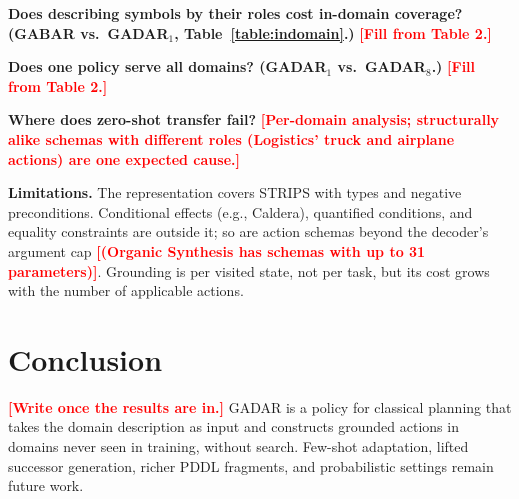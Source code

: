 \documentclass[letterpaper]{article} %
\newcommand{\gadar}{GADAR}                    %
\newcommand{\todonum}[1]{\textcolor{red}{\textbf{[#1]}}}
\begin{document}
\textbf{Does describing symbols by their roles cost in-domain coverage?
(GABAR vs.\ \gadar{}$_1$, Table~\ref{table:indomain}.)} \todonum{Fill from
Table 2.}

\textbf{Does one policy serve all domains? (\gadar{}$_1$ vs.\ \gadar{}$_8$.)}
\todonum{Fill from Table 2.}

\textbf{Where does zero-shot transfer fail?} \todonum{Per-domain analysis;
structurally alike schemas with different roles (Logistics' truck and
airplane actions) are one expected cause.}

\textbf{Limitations.} The representation covers STRIPS with types and
negative preconditions. Conditional effects (e.g., Caldera), quantified
conditions, and equality constraints are outside it; so are action schemas
beyond the decoder's argument cap \todonum{(Organic Synthesis has schemas
with up to 31 parameters)}. Grounding is per visited state, not per task,
but its cost grows with the number of applicable actions.

\section{Conclusion}

\todonum{Write once the results are in.} \gadar{} is a policy for classical
planning that takes the domain description as input and constructs grounded
actions in domains never seen in training, without search. Few-shot
adaptation, lifted successor generation, richer PDDL fragments, and
probabilistic settings remain future work.


\end{document}
